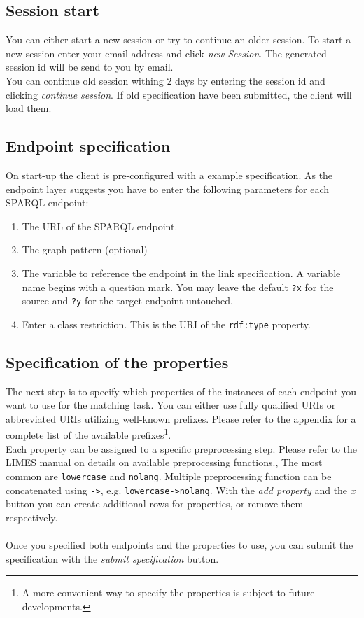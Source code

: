 \documentclass{article}
\begin{document}
\subsection{Session start}
You can either start a new session or try to continue an older session. To start a new session enter your email address and click \textit{new Session}. The generated session id will be send to you by email.\\ You can continue old session withing 2 days by entering the session id and clicking \textit{continue session}. If old specification have been submitted, the client will load them.
\subsection{Endpoint specification}
On start-up the client is pre-configured with a example specification. As the endpoint layer suggests you have to enter the following parameters for each SPARQL endpoint:

\begin{enumerate}
	\item The URL of the SPARQL endpoint.
	\item The graph pattern (optional)
	\item The variable to reference the endpoint in the link specification. A variable name begins with a question mark. You may leave the default \texttt{?x} for the source and \texttt{?y} for the target endpoint untouched.
	\item Enter a class restriction. This is the URI of the \texttt{rdf:type} property.
\end{enumerate}

\subsection{Specification of the properties}
The next step is to specify which properties of the instances of each endpoint you want to use for the matching task. You can either use fully qualified URIs or abbreviated URIs utilizing well-known prefixes. Please refer to the appendix for a complete list of the available prefixes\footnote{A more convenient way to specify the properties is subject to future developments.}.\\Each property can be assigned to a specific preprocessing step. Please refer to the LIMES manual on details on available preprocessing functions., The most common are \texttt{lowercase} and \texttt{nolang}. Multiple preprocessing function can be concatenated using \texttt{->}, e.g. \texttt{lowercase->nolang}. With the \textit{add property} and the \textit{x} button you can create additional rows for properties, or remove them respectively.\\ \\
Once you specified both endpoints and the properties to use, you can submit the specification with the \textit{submit specification}  button.
\end{document}

